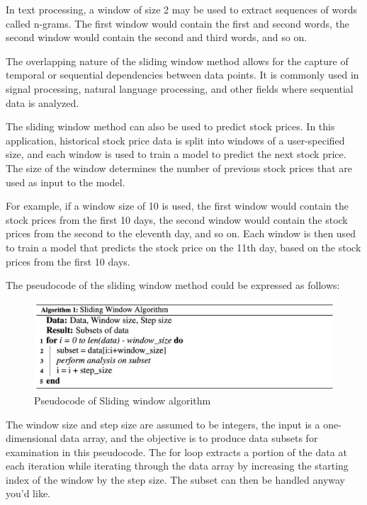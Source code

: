 \documentclass[a4paper]{article}
\begin{document}
In text processing, a window of size 2 may be used to extract sequences of words called n-grams. The first window would contain the first and second words, the second window would contain the second and third words, and so on.

The overlapping nature of the sliding window method allows for the capture of temporal or sequential dependencies between data points. It is commonly used in signal processing, natural language processing, and other fields where sequential data is analyzed.

The sliding window method can also be used to predict stock prices. In this application, historical stock price data is split into windows of a user-specified size, and each window is used to train a model to predict the next stock price. The size of the window determines the number of previous stock prices that are used as input to the model.

For example, if a window size of 10 is used, the first window would contain the stock prices from the first 10 days, the second window would contain the stock prices from the second to the eleventh day, and so on. Each window is then used to train a model that predicts the stock price on the 11th day, based on the stock prices from the first 10 days.

The pseudocode of the sliding window method could be expressed as follows:

\begin{figure}
    \centering
    \includegraphics[width=15cm]{windowing.png}
    \caption{Pseudocode of Sliding window algorithm}
    \label{fig:my_label}
\end{figure}

The window size and step size are assumed to be integers, the input is a one-dimensional data array, and the objective is to produce data subsets for examination in this pseudocode. The for loop extracts a portion of the data at each iteration while iterating through the data array by increasing the starting index of the window by the step size. The subset can then be handled anyway you'd like.
\end{document}
